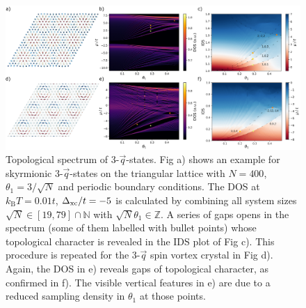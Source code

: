 \documentclass[
    10pt,
    aps,
    prl,
    twocolumn,
    floatfix,
    superscriptaddress
]{revtex4-2}
\begin{document}
\begin{figure}[t]
 \centering
 \includegraphics[width=0.86\linewidth]{../gfx/figure_02/figure_02.png}
 \caption{
     Topological spectrum of 3-$\vec{q}$-states.
     Fig a) shows an example for skyrmionic 3-$\vec{q}$-states on the triangular lattice with $N=400$, $\theta_1 = 3/\sqrt{N}$ and periodic boundary conditions.
     The DOS at $k_\mathrm{B}T = 0.01t$, $\Delta_\mathrm{xc} / t=-5$ is calculated by combining all system sizes $\sqrt{N} \in [19,79]\cap \mathbb{N}$ with  $\sqrt{N}\theta_1 \in \mathbb{Z}$.
     A series of gaps opens in the spectrum (some of them labelled with bullet points) whose topological character is revealed in the IDS plot of Fig c).
     This procedure is repeated for the 3-$\vec{q}$ spin vortex crystal in Fig d).
    Again, the DOS in e) reveals gaps of topological character, as confirmed in f).
    The visible vertical features in e) are due to a reduced sampling density in $\theta_1$ at those points. 
 }  
 \label{fig:three_q_states}
\end{figure}
\end{document}
